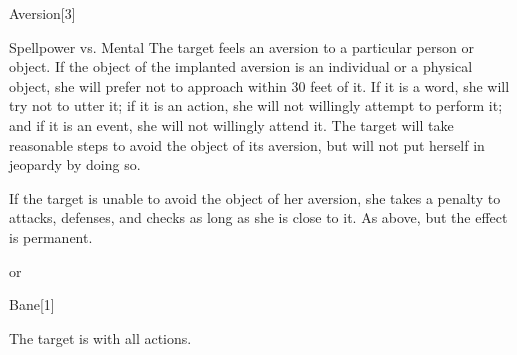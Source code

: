\begin{spellsection}{Aversion}[3]
    \begin{spellheader}
    \end{spellheader}
    \begin{spellcontent}
        \begin{spelltargetinginfo}
        \end{spelltargetinginfo}
        \begin{spelleffects}
            \begin{spellattack}{Spellpower vs. Mental}
                \spellsuccess The target feels an aversion to a particular person or object. If the object of the implanted aversion is an individual or a physical object, she will prefer not to approach within 30 feet of it. If it is a word, she will try not to utter it; if it is an action, she will not willingly attempt to perform it; and if it is an event, she will not willingly attend it. The target will take reasonable steps to avoid the object of its aversion, but will not put herself in jeopardy by doing so.
                \par If the target is unable to avoid the object of her aversion, she takes a  penalty to attacks, defenses, and checks as long as she is close to it.
                \spellcritical As above, but the effect is permanent.
            \end{spellattack}
            \spelldur \durshort or \durperm
        \end{spelleffects}
    \end{spellcontent}
    \begin{spellfooter}
        \miscastrandom
    \end{spellfooter}
\end{spellsection}


\begin{spellsection}{Bane}[1]
    \begin{spellheader}
    \end{spellheader}
    \begin{spellcontent}
        \begin{spelltargetinginfo}
        \end{spelltargetinginfo}
        \begin{spelleffects}
            \spelleffect The target is \impaired with all actions.

            \spelldur \durshort
        \end{spelleffects}
    \end{spellcontent}
    \begin{spellfooter}
        \miscastrandom
    \end{spellfooter}
\end{spellsection}

